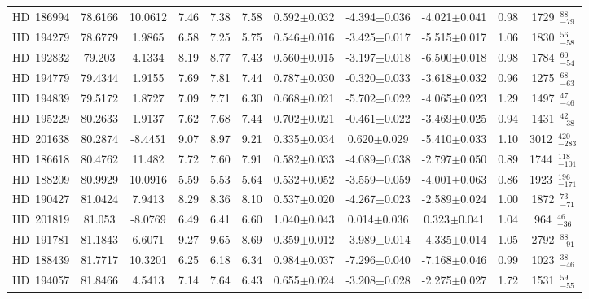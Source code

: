 {\begin{longtable}{lcccccccccc}
HD~186994 & 78.6166 & 10.0612 & 7.46 & 7.38 & 7.58 & 0.592$\pm$0.032 & -4.394$\pm$0.036 & -4.021$\pm$0.041 & 0.98 & 1729~$_{-79}^{88}$ \\
\noalign{\smallskip}
HD~194279 & 78.6779 & 1.9865 & 6.58 & 7.25 & 5.75 & 0.546$\pm$0.016 & -3.425$\pm$0.017 & -5.515$\pm$0.017 & 1.06 & 1830~$_{-58}^{56}$ \\
\noalign{\smallskip}
HD~192832 & 79.203 & 4.1334 & 8.19 & 8.77 & 7.43 & 0.560$\pm$0.015 & -3.197$\pm$0.018 & -6.500$\pm$0.018 & 0.98 & 1784~$_{-54}^{60}$ \\
\noalign{\smallskip}
HD~194779 & 79.4344 & 1.9155 & 7.69 & 7.81 & 7.44 & 0.787$\pm$0.030 & -0.320$\pm$0.033 & -3.618$\pm$0.032 & 0.96 & 1275~$_{-63}^{68}$ \\
\noalign{\smallskip}
HD~194839 & 79.5172 & 1.8727 & 7.09 & 7.71 & 6.30 & 0.668$\pm$0.021 & -5.702$\pm$0.022 & -4.065$\pm$0.023 & 1.29 & 1497~$_{-46}^{47}$ \\
\noalign{\smallskip}
HD~195229 & 80.2633 & 1.9137 & 7.62 & 7.68 & 7.44 & 0.702$\pm$0.021 & -0.461$\pm$0.022 & -3.469$\pm$0.025 & 0.94 & 1431~$_{-38}^{42}$ \\
\noalign{\smallskip}
HD~201638 & 80.2874 & -8.4451 & 9.07 & 8.97 & 9.21 & 0.335$\pm$0.034 & 0.620$\pm$0.029 & -5.410$\pm$0.033 & 1.10 & 3012~$_{-283}^{420}$ \\
\noalign{\smallskip}
HD~186618 & 80.4762 & 11.482 & 7.72 & 7.60 & 7.91 & 0.582$\pm$0.033 & -4.089$\pm$0.038 & -2.797$\pm$0.050 & 0.89 & 1744~$_{-101}^{118}$ \\
\noalign{\smallskip}
HD~188209 & 80.9929 & 10.0916 & 5.59 & 5.53 & 5.64 & 0.532$\pm$0.052 & -3.559$\pm$0.059 & -4.001$\pm$0.063 & 0.86 & 1923~$_{-171}^{196}$ \\
\noalign{\smallskip}
HD~190427 & 81.0424 & 7.9413 & 8.29 & 8.36 & 8.10 & 0.537$\pm$0.020 & -4.267$\pm$0.023 & -2.589$\pm$0.024 & 1.00 & 1872~$_{-71}^{73}$ \\
\noalign{\smallskip}
HD~201819 & 81.053 & -8.0769 & 6.49 & 6.41 & 6.60 & 1.040$\pm$0.043 & 0.014$\pm$0.036 & 0.323$\pm$0.041 & 1.04 & 964~$_{-36}^{46}$ \\
\noalign{\smallskip}
HD~191781 & 81.1843 & 6.6071 & 9.27 & 9.65 & 8.69 & 0.359$\pm$0.012 & -3.989$\pm$0.014 & -4.335$\pm$0.014 & 1.05 & 2792~$_{-91}^{88}$ \\
\noalign{\smallskip}
HD~188439 & 81.7717 & 10.3201 & 6.25 & 6.18 & 6.34 & 0.984$\pm$0.037 & -7.296$\pm$0.040 & -7.168$\pm$0.046 & 0.99 & 1023~$_{-46}^{38}$ \\
\noalign{\smallskip}
HD~194057 & 81.8466 & 4.5413 & 7.14 & 7.64 & 6.43 & 0.655$\pm$0.024 & -3.208$\pm$0.028 & -2.275$\pm$0.027 & 1.72 & 1531~$_{-55}^{59}$ \\

\end{longtable}}
